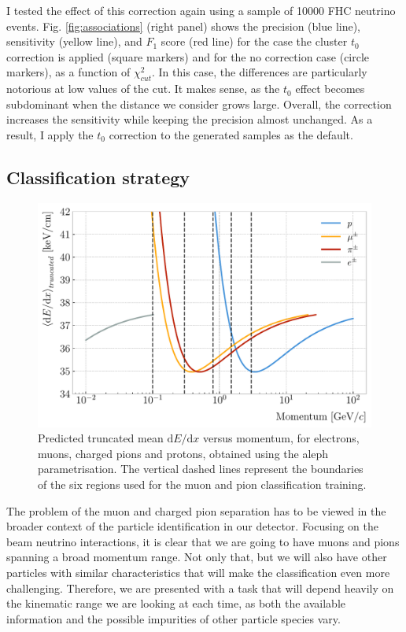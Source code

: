 I tested the effect of this correction again using a sample of 10000 FHC neutrino events. Fig. \ref{fig:associations} (right panel) shows the precision (blue line), sensitivity (yellow line), and $F_{1}$ score (red line) for the case the cluster $t_{0}$ correction is applied (square markers) and for the no correction case (circle markers), as a function of $\chi^{2}_{cut}$. In this case, the differences are particularly notorious at low values of the cut. It makes sense, as the $t_{0}$ effect becomes subdominant when the distance we consider grows large. Overall, the correction increases the sensitivity while keeping the precision almost unchanged. As a result, I apply the $t_{0}$ correction to the generated samples as the default.

\subsection{Classification strategy}

\begin{figure}[t]
	\centering
	\includegraphics[width=.80\linewidth]{Images/GArSoft_PID/BDT/dEdx_fit_only.pdf}
	\caption{Predicted truncated mean $\mathrm{d}E/\mathrm{d}x$ versus momentum, for electrons, muons, charged pions and protons, obtained using the \gls{aleph} parametrisation. The vertical dashed lines represent the boundaries of the six regions used for the muon and pion classification training.}
	\label{fig:dEdx_vs_momentum_regions}
\end{figure}

The problem of the muon and charged pion separation has to be viewed in the broader context of the particle identification in our detector. Focusing on the beam neutrino interactions, it is clear that we are going to have muons and pions spanning a broad momentum range. Not only that, but we will also have other particles with similar characteristics that will make the classification even more challenging. Therefore, we are presented with a task that will depend heavily on the kinematic range we are looking at each time, as both the available information and the possible impurities of other particle species vary.

